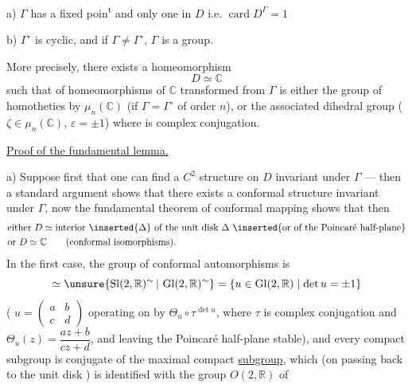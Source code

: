  a) $\Gamma$ has a fixed poin\textsuperscript{t} and only one in $D$ i.e. $\operatorname{card}D^\Gamma=1$

 b)  $\Gamma^\circ$ is cyclic, and if $\Gamma\ne\Gamma^\circ$, $\Gamma$ is a  group.

More precisely, there exists a homeomorphism
\[
D\simeq\mathbb C
\]
such that    of homeomorphisms of $\mathbb C$ transformed from   $\Gamma$ is either the group of homotheties by $\mu_n(\mathbb C)$ (if $\Gamma=\Gamma^\circ$ of order $n$), or the associated dihedral group  ($\zeta\in\mu_n(\mathbb C)$, $\varepsilon=\pm1$) where \unsure{$\sigma$}  is complex conjugation.

\uline{Proof of the fundamental lemma.}







 a) Suppose first that one can find a $C^2$ structure on $D$ invariant under $\Gamma$ --- then a standard argument shows that there exists a conformal structure invariant under $\Gamma$, now the fundamental theorem of conformal mapping shows that then
\[
\begin{aligned}
&\text{either }D\simeq\text{interior}\ \inserted{\Delta}\ \text{of the unit disk }\Delta\ \inserted{\text{or of the Poincaré half-plane}}\\
&\text{or }D\simeq\mathbb C\qquad\text{(conformal isomorphisms).}
\end{aligned}
\]
In the first case, the group of conformal automorphisms  is
\[
\simeq\unsure{\operatorname{Sl}(2,\mathbb R)^\sim\,|\,\operatorname{Gl}(2,\mathbb R)^\sim}
=\{u\in\operatorname{Gl}(2,\mathbb R)\mid\det u=\pm1\}
\]
( $u=\left(\begin{smallmatrix}a&b\\c&d\end{smallmatrix}\right)$ operating on   by  $\Theta_u\circ\tau^{\det u}$, where $\tau$ is complex conjugation and $\Theta_u(z)=\dfrac{az+b}{cz+d}$, and leaving the Poincaré half-plane stable), and every compact subgroup is  conjugate of the maximal compact \uline{subgroup}, which (on passing back to the unit disk \inserted{$\Delta$}) is identified with the group $O(2,\mathbb R)$ of

